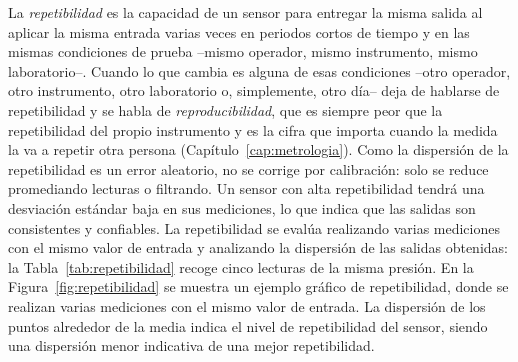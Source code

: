 \begin{marginfigure}
    \centering
    \caption[Ejemplo de banda muerta.]{Ejemplo de banda muerta. Es común en sistemas mecánicos con fricción o en sensores que requieren una fuerza mínima para activar la salida.}\label{fig:banda_muerta}
\end{marginfigure}

La \emph{repetibilidad} es la capacidad de un sensor para entregar la misma salida al aplicar la misma entrada varias veces en periodos cortos de tiempo y en las mismas condiciones de prueba --mismo operador, mismo instrumento, mismo laboratorio--. Cuando lo que cambia es alguna de esas condiciones --otro operador, otro instrumento, otro laboratorio o, simplemente, otro día-- deja de hablarse de repetibilidad y se habla de \emph{reproducibilidad}, que es siempre peor que la repetibilidad del propio instrumento y es la cifra que importa cuando la medida la va a repetir otra persona (Capítulo~\ref{cap:metrologia}). Como la dispersión de la repetibilidad es un error aleatorio, no se corrige por calibración: solo se reduce promediando lecturas o filtrando. Un sensor con alta repetibilidad tendrá una desviación estándar baja en sus mediciones, lo que indica que las salidas son consistentes y confiables. La repetibilidad se evalúa realizando varias mediciones con el mismo valor de entrada y analizando la dispersión de las salidas obtenidas: la Tabla~\ref{tab:repetibilidad} recoge cinco lecturas de la misma presión. En la Figura~\ref{fig:repetibilidad} se muestra un ejemplo gráfico de repetibilidad, donde se realizan varias mediciones con el mismo valor de entrada. La dispersión de los puntos alrededor de la media indica el nivel de repetibilidad del sensor, siendo una dispersión menor indicativa de una mejor repetibilidad. 

